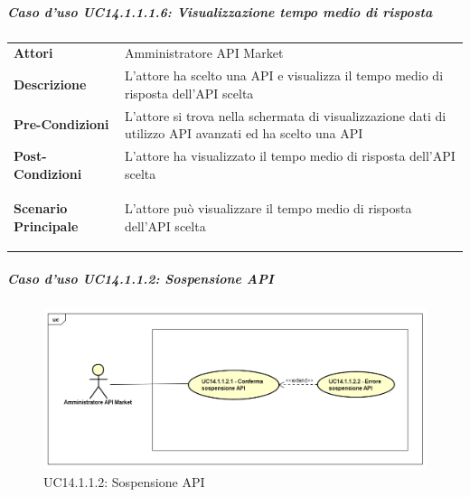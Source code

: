 \subparagraph{Caso d'uso UC14.1.1.1.6: Visualizzazione tempo medio di risposta}
\label{UC14_1_1_1_6}

\begin{minipage}{\linewidth}
	\begin{tabular}{ l | p{11cm}}
		\hline
		\rowcolor{Gray}
		\multicolumn{2}{c}{UC14.1.1.1.6 - Visualizzazione tempo medio di risposta} \\
		\hline
		\textbf{Attori} & Amministratore API Market \\
		\textbf{Descrizione} & L'attore ha scelto una API e visualizza il tempo medio di risposta dell'API scelta \\
		\textbf{Pre-Condizioni} & L'attore si trova nella schermata di visualizzazione dati di utilizzo API avanzati ed ha scelto una API \\
		\textbf{Post-Condizioni} & L'attore ha visualizzato il tempo medio di risposta dell'API scelta \\
		\textbf{Scenario Principale} & 
		\begin{enumerate*}[label=(\arabic*.),itemjoin={\newline}]
			\item L'attore può visualizzare il tempo medio di risposta dell'API scelta
		\end{enumerate*}\\
	\end{tabular}
\end{minipage}

\newpage
\subparagraph{Caso d'uso UC14.1.1.2: Sospensione API}
\label{UC14_1_1_2}
\begin{figure}[ht]
	\centering
	\includegraphics[scale=0.45]{UML/UC14_1_1_2.png}
	\caption{UC14.1.1.2: Sospensione API}
\end{figure}

